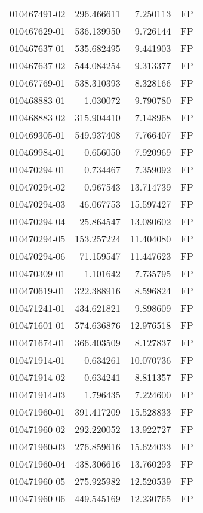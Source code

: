 \begin{tabular}{lrrl}
010467491-02 &  296.466611 &     7.250113 &   FP \\
010467629-01 &  536.139950 &     9.726144 &   FP \\
010467637-01 &  535.682495 &     9.441903 &   FP \\
010467637-02 &  544.084254 &     9.313377 &   FP \\
010467769-01 &  538.310393 &     8.328166 &   FP \\
010468883-01 &    1.030072 &     9.790780 &   FP \\
010468883-02 &  315.904410 &     7.148968 &   FP \\
010469305-01 &  549.937408 &     7.766407 &   FP \\
010469984-01 &    0.656050 &     7.920969 &   FP \\
010470294-01 &    0.734467 &     7.359092 &   FP \\
010470294-02 &    0.967543 &    13.714739 &   FP \\
010470294-03 &   46.067753 &    15.597427 &   FP \\
010470294-04 &   25.864547 &    13.080602 &   FP \\
010470294-05 &  153.257224 &    11.404080 &   FP \\
010470294-06 &   71.159547 &    11.447623 &   FP \\
010470309-01 &    1.101642 &     7.735795 &   FP \\
010470619-01 &  322.388916 &     8.596824 &   FP \\
010471241-01 &  434.621821 &     9.898609 &   FP \\
010471601-01 &  574.636876 &    12.976518 &   FP \\
010471674-01 &  366.403509 &     8.127837 &   FP \\
010471914-01 &    0.634261 &    10.070736 &   FP \\
010471914-02 &    0.634241 &     8.811357 &   FP \\
010471914-03 &    1.796435 &     7.224600 &   FP \\
010471960-01 &  391.417209 &    15.528833 &   FP \\
010471960-02 &  292.220052 &    13.922727 &   FP \\
010471960-03 &  276.859616 &    15.624033 &   FP \\
010471960-04 &  438.306616 &    13.760293 &   FP \\
010471960-05 &  275.925982 &    12.520539 &   FP \\
010471960-06 &  449.545169 &    12.230765 &   FP \\

\end{tabular}
